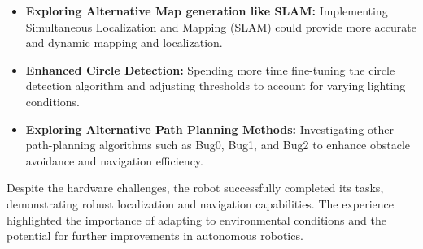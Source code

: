 \documentclass{article}
\begin{document}
	\begin{itemize}
		\item \textbf{Exploring Alternative Map generation like SLAM:} Implementing Simultaneous Localization and Mapping (SLAM) could provide more accurate and dynamic mapping and localization.
		\item \textbf{Enhanced Circle Detection:} Spending more time fine-tuning the circle detection algorithm and adjusting thresholds to account for varying lighting conditions.
		\item \textbf{Exploring Alternative Path Planning Methods:} Investigating other path-planning algorithms such as Bug0, Bug1, and Bug2 to enhance obstacle avoidance and navigation efficiency.
	\end{itemize}
	Despite the hardware challenges, the robot successfully completed its tasks, demonstrating robust localization and navigation capabilities. The experience highlighted the importance of adapting to environmental conditions and the potential for further improvements in autonomous robotics.
	\clearpage
	\appendix
\end{document}
